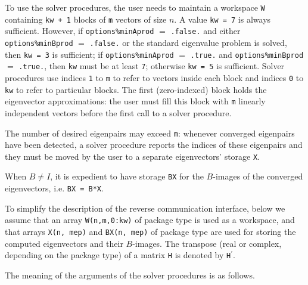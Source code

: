 \medskip
To use the solver procedures,
the user needs to maintain a workspace {\tt W} containing
{\tt kw + 1} blocks of {\tt m} vectors of size $n$.
A value {\tt kw = 7} is always sufficient. 
However, if {\tt options\%minAprod} $=$ {\tt .false.}
and either {\tt options\%minBprod} $=$ {\tt .false.} or 
the standard eigenvalue problem  is solved,
then {\tt kw = 3} is sufficient; 
if 
{\tt options\%minAprod} $=$ {\tt .true.} and
{\tt options\%minBprod} $=$ {\tt .true.},
then {\tt kw} must be at least {\tt 7};
otherwise {\tt kw = 5} is sufficient.
Solver procedures
use indices {\tt 1} to {\tt m} 
to refer to vectors inside each block
and indices {\tt 0} to {\tt kw} 
to refer to particular blocks.
The first (zero-indexed) block holds the eigenvector approximations:
the user must fill this block with 
{\tt m} linearly independent vectors before the first call
to a solver procedure.

The number of desired eigenpairs may exceed {\tt m}:
whenever converged eigenpairs have been detected,
a solver procedure reports the indices of these eigenpairs
and they must be moved by the user
to a separate eigenvectors' storage {\tt X}.

When $B \ne I$,
it is expedient to 
have %
storage {\tt BX}
for the $B$-images of the converged eigenvectors,
i.e. {\tt BX = B*X}.

To simplify the description of the %
reverse communication interface,
below we assume that an array
{\tt W(n,m,0:kw)} of package type
is used as a workspace,
and that arrays {\tt X(n, mep)} and {\tt BX(n, mep)} of package type
are used for storing the computed eigenvectors
and their $B$-images.
The transpose (real or complex, depending on the package type)
of a matrix {\tt H} 
is denoted by {\tt H}$^\prime$.

\medskip
The meaning of the arguments of the solver procedures is as follows.

